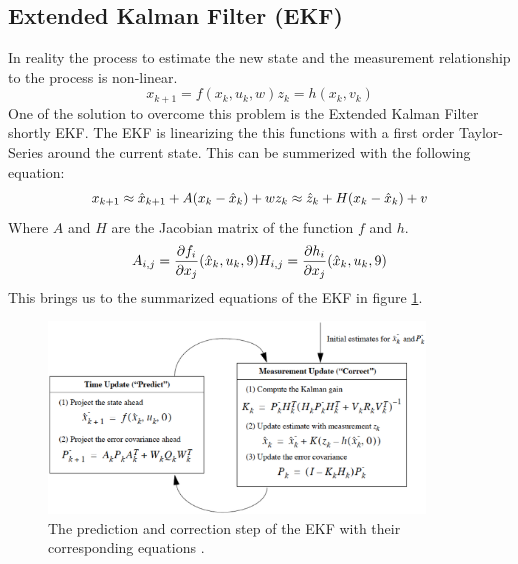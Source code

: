 \subsection*{Extended Kalman Filter (EKF)}\label{ekf}
In reality the process to estimate the new state and the measurement relationship to the process is non-linear.
\begin{equation}
x_{k+1}=f(x_k,u_k,w)
z_k=h(x_k,v_k)
\end{equation}
One of the solution to overcome this problem is the Extended Kalman Filter shortly EKF. The EKF is linearizing the this functions with a first order Taylor-Series around the current state. This can be summerized with the following equation:
\begin{equation}
x_{k+1}\approx \hat{x}_{k+1}+A(x_k-\hat{x}_k)+w\\
z_k\approx \hat{z}_k+H(x_k-\hat{x}_k) +v 
\end{equation}
Where $A$ and $H$ are the Jacobian matrix of the function $f$ and $h$.
\begin{equation}
A_{i,j}=\frac{\partial f_{i}}{\partial x_j}(\hat{x}_k,u_k,9)\\
H_{i,j}=\frac{\partial h_{i}}{\partial x_j}(\hat{x}_k,u_k,9)
\end{equation}
This brings us to the summarized equations of the EKF in figure \ref{equation_ekf}.
\begin{figure}[h]
\begin{center}
\includegraphics[width=10cm]{pictures/equation_ekf.eps}
\caption{The prediction and correction step of the EKF with their corresponding equations \cite{welch1997}. }
\label{equation_ekf}
\end{center}
\end{figure}


